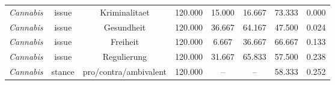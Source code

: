 \begin{tabular}{c c c c c c c c}
      \textit{Cannabis} & issue & Kriminalitaet & 120.000 & 15.000 & 16.667 & 73.333 & 0.000 \\
      \textit{Cannabis} & issue & Gesundheit & 120.000 & 36.667 & 64.167 & 47.500 & 0.024 \\
      \textit{Cannabis} & issue & Freiheit & 120.000 & 6.667 & 36.667 & 66.667 & 0.133 \\
      \textit{Cannabis} & issue & Regulierung & 120.000 & 31.667 & 65.833 & 57.500 & 0.238 \\
      \textit{Cannabis} & stance & pro/contra/ambivalent & 120.000 & -- & -- & 58.333 & 0.252 \\
      \hline
    \end{tabular}